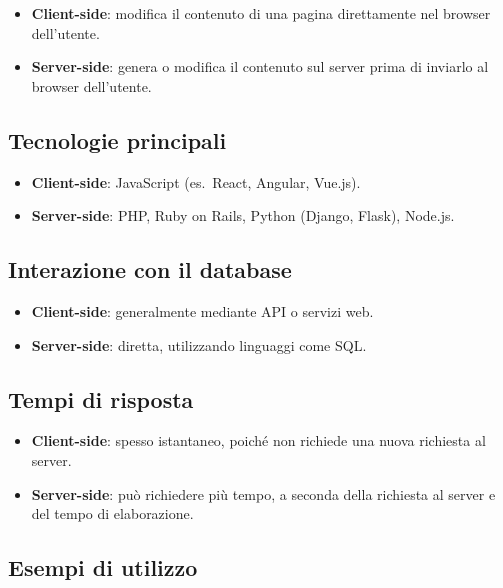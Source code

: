\begin{itemize}
    \item \textbf{Client-side}: modifica il contenuto di una pagina direttamente nel browser dell'utente.
    \item \textbf{Server-side}: genera o modifica il contenuto sul server prima di inviarlo al browser dell'utente.
\end{itemize}

\subsection{Tecnologie principali}

\begin{itemize}
    \item \textbf{Client-side}: JavaScript (es.\ React, Angular, Vue.js).
    \item \textbf{Server-side}: PHP, Ruby on Rails, Python (Django, Flask), Node.js.
\end{itemize}

\subsection{Interazione con il database}

\begin{itemize}
    \item \textbf{Client-side}: generalmente mediante API o servizi web.
    \item \textbf{Server-side}: diretta, utilizzando linguaggi come SQL.
\end{itemize}

\subsection{Tempi di risposta}

\begin{itemize}
    \item \textbf{Client-side}: spesso istantaneo, poiché non richiede una nuova richiesta al server.
    \item \textbf{Server-side}: può richiedere più tempo, a seconda della richiesta al server e del tempo di elaborazione.
\end{itemize}

\subsection{Esempi di utilizzo}

